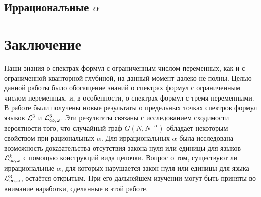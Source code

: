 \documentclass{mipt-thesis-bs}
\begin{document}
\subsection{Иррациональные $\alpha$}

\newpage

\section{Заключение}
Наши знания о спектрах формул с ограниченным числом переменных, как и с ограниченной кванторной глубиной, на данный момент далеко не полны.
Целью данной работы было обогащение знаний о спектрах формул с ограниченным числом переменных, и, в особенности, о спектрах формул с тремя переменными.
В работе были получены новые результаты о предельных точках спектров формул языков $\mathcal{L}^3$ и $\mathcal{L}^3_{\infty, \omega}$.
Эти результаты связаны с исследованием сходимости вероятности того, что случайный граф $G(N, N^{-\alpha})$ обладает некоторым свойством при рациональных $\alpha$.
Для иррациональных $\alpha$ была исследована возможность доказательства отсутствия закона нуля или единицы для языков $\mathcal{L}^k_{\infty, \omega}$ с помощью конструкций вида цепочки.
Вопрос о том, существуют ли иррациональные $\alpha$, для которых нарушается закон нуля или единицы для языка $\mathcal{L}^3_{\infty, \omega}$, остаётся открытым.
При его дальнейшем изучении могут быть приняты во внимание наработки, сделанные в этой работе.
\newpage



\end{document}
